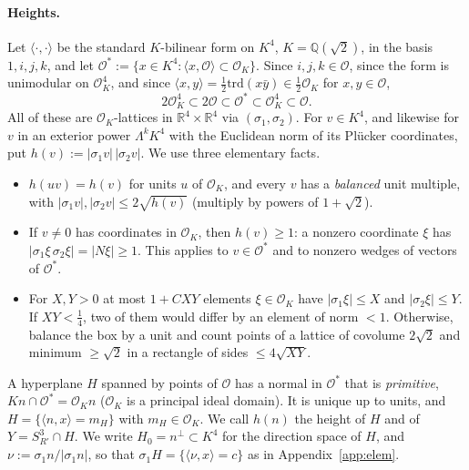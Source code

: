 \documentclass[aps,prx,twocolumn,superscriptaddress,nofootinbib,longbibliography]{revtex4-2}
\theoremstyle{plain}
\theoremstyle{definition}
\theoremstyle{remark}
\newcommand{\Q}{\mathbb{Q}}
\newcommand{\R}{\mathbb{R}}
\begin{document}
\paragraph{Heights.} Let $\langle\cdot,\cdot\rangle$ be the standard $K$-bilinear form on $K^4$, $K=\Q(\sqrt2)$, in the basis $1,i,j,k$, and let $\mathcal O^*:=\{x\in K^4:\langle x,\mathcal O\rangle\subset\mathcal O_K\}$. Since $i,j,k\in\mathcal O$, since the form is unimodular on $\mathcal O_K^4$, and since $\langle x,y\rangle=\tfrac12\mathrm{trd}(x\bar y)\in\tfrac12\mathcal O_K$ for $x,y\in\mathcal O$,
\[
2\mathcal O_K^4\subset2\mathcal O\subset\mathcal O^*\subset\mathcal O_K^4\subset\mathcal O .
\]
All of these are $\mathcal O_K$-lattices in $\R^4\times\R^4$ via $(\sigma_1,\sigma_2)$. For $v\in K^4$, and likewise for $v$ in an exterior power $\Lambda^kK^4$ with the Euclidean norm of its Plücker coordinates, put $h(v):=|\sigma_1v|\,|\sigma_2v|$. We use three elementary facts.
\begin{itemize}\setlength\itemsep{0pt}
\item[(H1)] $h(uv)=h(v)$ for units $u$ of $\mathcal O_K$, and every $v$ has a \emph{balanced} unit multiple, with $|\sigma_1v|,|\sigma_2v|\le2\sqrt{h(v)}$ (multiply by powers of $1+\sqrt2$).
\item[(H2)] If $v\ne0$ has coordinates in $\mathcal O_K$, then $h(v)\ge1$: a nonzero coordinate $\xi$ has $|\sigma_1\xi\,\sigma_2\xi|=|N\xi|\ge1$. This applies to $v\in\mathcal O^*$ and to nonzero wedges of vectors of $\mathcal O^*$.
\item[(H3)] For $X,Y>0$ at most $1+CXY$ elements $\xi\in\mathcal O_K$ have $|\sigma_1\xi|\le X$ and $|\sigma_2\xi|\le Y$. If $XY<\tfrac14$, two of them would differ by an element of norm $<1$. Otherwise, balance the box by a unit and count points of a lattice of covolume $2\sqrt2$ and minimum $\ge\sqrt2$ in a rectangle of sides $\le4\sqrt{XY}$.
\end{itemize}
A hyperplane $H$ spanned by points of $\mathcal O$ has a normal in $\mathcal O^*$ that is \emph{primitive}, $Kn\cap\mathcal O^*=\mathcal O_Kn$ ($\mathcal O_K$ is a principal ideal domain). It is unique up to units, and $H=\{\langle n,x\rangle=m_H\}$ with $m_H\in\mathcal O_K$. We call $h(n)$ the height of $H$ and of $Y=S^3_{R'}\cap H$. We write $H_0=n^\perp\subset K^4$ for the direction space of $H$, and $\nu:=\sigma_1n/|\sigma_1n|$, so that $\sigma_1H=\{\langle\nu,x\rangle=c\}$ as in Appendix~\ref{app:elem}.
\end{document}
